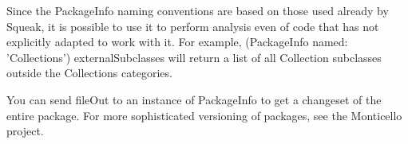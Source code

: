 \documentclass[a4paper,10pt,twoside]{book}
\begin{document}
Since the PackageInfo naming conventions are based on those used already by Squeak, it is possible to use it to perform analysis even of code that has not explicitly adapted to work with it. For example, (PackageInfo named: 'Collections') externalSubclasses will return a list of all Collection subclasses outside the Collections categories.

You can send fileOut to an instance of PackageInfo to get a changeset of the entire package. For more sophisticated versioning of packages, see the Monticello project.


\ifx\wholebook\relax\else
   
   
\end{document}
